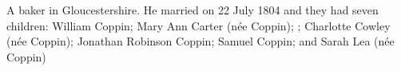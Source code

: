 
A baker in Gloucestershire.
He married  on 22 July 1804\cite{GeniSarahCoppin}
and they had seven children:
William Coppin;
Mary Ann Carter (n\'{e}e Coppin);
\cite{MerrettCoppinMarriageCert};
Charlotte Cowley (n\'{e}e Coppin);
Jonathan Robinson Coppin;
Samuel Coppin;
and Sarah Lea (n\'{e}e Coppin)
